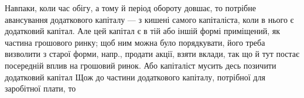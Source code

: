 Навпаки, коли час обігу, а тому й період обороту довшає, то потрібне
авансування додаткового капіталу — з кишені самого капіталіста,
коли в нього є додатковий капітал. Але цей капітал є в тій
або іншій формі приміщений, як частина грошового ринку; щоб ним
можна було порядкувати, його треба визволити з старої форми, напр.,
продати акції, взяти вклади, так що й тут постає посередній вплив на
грошовий ринок. Або капіталіст мусить десь позичити додатковий капітал
Щож до частини додаткового капіталу, потрібної для заробітної плати, то
\parbreak{}  %
